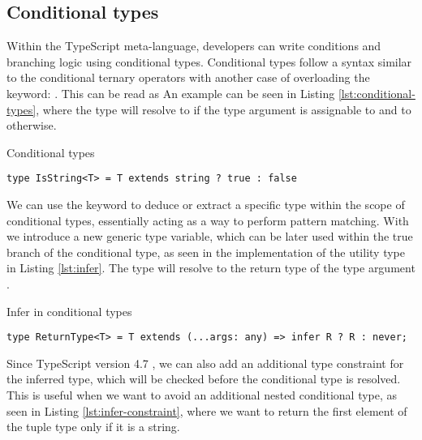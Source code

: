 \subsection{Conditional types}

Within the TypeScript meta-language, developers can write conditions and branching logic using conditional types. Conditional types follow a syntax similar to the conditional ternary operators with another case of overloading the  keyword: . This can be read as  An example can be seen in Listing \ref{lst:conditional-types}, where the  type will resolve to  if the type argument  is assignable to  and to  otherwise.

\begin{listing}[h]
  \caption{Conditional types}\label{lst:conditional-types}
  \begin{verbatim}
type IsString<T> = T extends string ? true : false
\end{verbatim}
\end{listing}

We can use the  keyword to deduce or extract a specific type within the scope of conditional types, essentially acting as a way to perform pattern matching. With  we introduce a new generic type variable, which can be later used within the true branch of the conditional type, as seen in the implementation of the  utility type in Listing \ref{lst:infer}. The  type will resolve to the return type of the type argument .

\begin{listing}[h]
  \caption{Infer in conditional types}\label{lst:infer}
  \begin{verbatim}
type ReturnType<T> = T extends (...args: any) => infer R ? R : never;
\end{verbatim}
\end{listing}

Since TypeScript version 4.7 \cite{rosenwasserAnnouncingTypeScript2022}, we can also add an additional type constraint for the inferred type, which will be checked before the conditional type is resolved. This is useful when we want to avoid an additional nested conditional type, as seen in Listing \ref{lst:infer-constraint}, where we want to return the first element of the tuple type only if it is a string.


